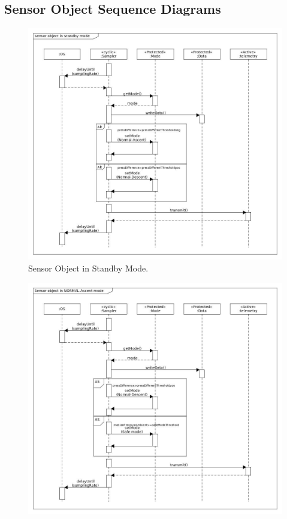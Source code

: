 \documentclass[a4paper,12pt,oneside]{article}
\begin{document}
\begin{appendices}
\begin{landscape}
\subsection{Sensor Object Sequence Diagrams}
\begin{figure}[H]
    \centering
    \includegraphics[height=0.8\textwidth]{appendix/img/softwareDiagrams/Sequance-Diagram-standby-Mode.jpg}
    \caption{Sensor Object in Standby Mode.}
    \label{sensora}
\end{figure}
\begin{figure}[H]
    \centering
    \includegraphics[height=0.9\textwidth]{appendix/img/softwareDiagrams/Sequance-Diagram ascent-Mode.jpg}

\end{figure}
\end{landscape}
\end{appendices}
\end{document}
